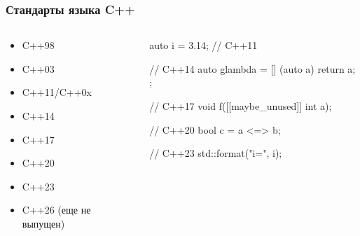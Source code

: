\documentclass[compress]{beamer}
\begin{document}
\begin{frame}[fragile]

    \frametitle{Стандарты языка C++}

    \begin{columns}

        \begin{column}{0.4\textwidth}

            \begin{itemize}

                \item C++98
                \item C++03
                \item C++11/C++0x
                \item C++14
                \item C++17
                \item C++20
                \item C++23
                \item C++26 (еще не выпущен)

            \end{itemize}

        \end{column}

        \begin{column}{0.6\textwidth}

            \begin{myinplacelisting}[minted language=cpp]
auto i = 3.14; // C++11

// C++14
auto glambda = [] (auto a) {
    return a;
};

// C++17
void f([[maybe_unused]] int a);

// C++20
bool c = a <=> b;

// C++23
std::format("i={}\n", i);
            \end{myinplacelisting}
        \end{column}

    \end{columns}

\end{frame}
\end{document}
